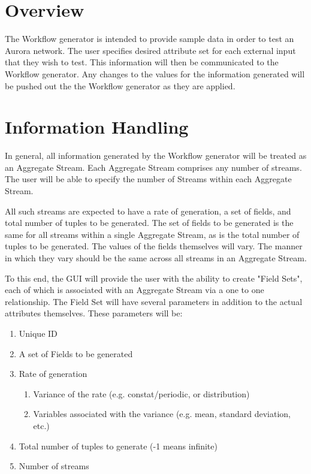 \documentclass[a4paper,12pt]{article}
\begin{document}
\newcommand{\thisproj}{\bf GUI Workflow}

\makeatletter                   %
\pagestyle{myheadings}              %
\def\@oddhead{\bf Aurora - \thisproj \hfill (arsinger, rly, yx)} 
\makeatother     

\section*{Overview}

The Workflow generator is intended to provide sample data in order to test an
Aurora network. The user specifies desired attribute set for each external input
that they wish to test. This information will then be communicated to the
Workflow generator. Any changes to the values for the information generated will
be pushed out the the Workflow generator as they are applied.

\section*{Information Handling}

In general, all information generated by the Workflow generator will be treated
as an Aggregate Stream. Each Aggregate Stream comprises any number of streams.
The user will be able to specify the number of Streams within each Aggregate
Stream. 

All such streams are expected to have a rate of generation, a set
of fields, and total number of tuples to be generated. The set of fields to
be generated is the same for all streams within a single Aggregate Stream, as is
the total number of tuples to be generated. The values of the fields
themselves will vary. The manner in which they vary should be the same
across all streams in an Aggregate Stream.

To this end, the GUI will provide the user with the ability to create "Field
Sets", each of which is associated with an Aggregate Stream via a one to one
relationship. The Field Set will have several parameters in addition to the
actual attributes themselves. These parameters will be:

\begin{enumerate}
\item Unique ID
\item A set of Fields to be generated
\item Rate of generation
\begin{enumerate}
\item Variance of the rate (e.g. constat/periodic, or distribution)
\item Variables associated with the variance (e.g. mean, standard deviation,
etc.)
\end{enumerate}
\item Total number of tuples to generate (-1 means infinite)
\item Number of streams
\end{enumerate}
\end{document}
